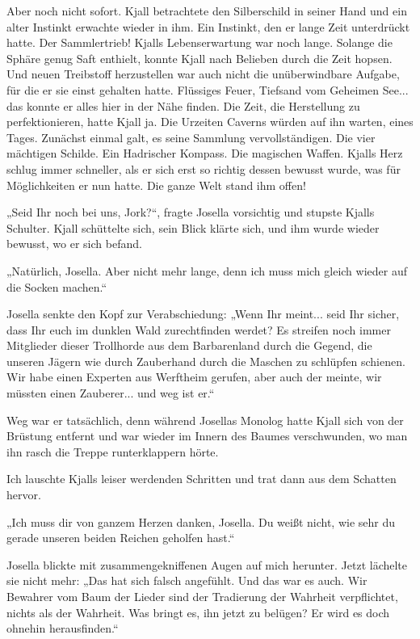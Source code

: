 \documentclass[10pt, a4paper, oneside]{book}
\begin{document}
Aber noch nicht sofort. Kjall betrachtete den Silberschild in seiner Hand und ein alter Instinkt erwachte wieder in ihm. Ein Instinkt, den er lange Zeit unterdrückt hatte. Der Sammlertrieb! Kjalls Lebenserwartung war noch lange. Solange die Sphäre genug Saft enthielt, konnte Kjall nach Belieben durch die Zeit hopsen. Und neuen Treibstoff herzustellen war auch nicht die unüberwindbare Aufgabe, für die er sie einst gehalten hatte. Flüssiges Feuer, Tiefsand vom Geheimen See... das konnte er alles hier in der Nähe finden. Die Zeit, die Herstellung zu perfektionieren, hatte Kjall ja. Die Urzeiten Caverns würden auf ihn warten, eines Tages. Zunächst einmal galt, es seine Sammlung vervollständigen. Die vier mächtigen Schilde. Ein Hadrischer Kompass. Die magischen Waffen. Kjalls Herz schlug immer schneller, als er sich erst so richtig dessen bewusst wurde, was für Möglichkeiten er nun hatte. Die ganze Welt stand ihm offen!\bigskip



„Seid Ihr noch bei uns, Jork?“, fragte Josella vorsichtig und stupste Kjalls Schulter. Kjall schüttelte sich, sein Blick klärte sich, und ihm wurde wieder bewusst, wo er sich befand.

„Natürlich, Josella. Aber nicht mehr lange, denn ich muss mich gleich wieder auf die Socken machen.“

Josella senkte den Kopf zur Verabschiedung: „Wenn Ihr meint... seid Ihr sicher, dass Ihr euch im dunklen Wald zurechtfinden werdet? Es streifen noch immer Mitglieder dieser Trollhorde aus dem Barbarenland durch die Gegend, die unseren Jägern wie durch Zauberhand durch die Maschen zu schlüpfen schienen. Wir habe einen Experten aus Werftheim gerufen, aber auch der meinte, wir müssten einen Zauberer... und weg ist er.“

Weg war er tatsächlich, denn während Josellas Monolog hatte Kjall sich von der Brüstung entfernt und war wieder im Innern des Baumes verschwunden, wo man ihn rasch die Treppe runterklappern hörte.

Ich lauschte Kjalls leiser werdenden Schritten und trat dann aus dem Schatten hervor.

„Ich muss dir von ganzem Herzen danken, Josella. Du weißt nicht, wie sehr du gerade unseren beiden Reichen geholfen hast.“

Josella blickte mit zusammengekniffenen Augen auf mich herunter. Jetzt lächelte sie nicht mehr: „Das hat sich falsch angefühlt. Und das war es auch. Wir Bewahrer vom Baum der Lieder sind der Tradierung der Wahrheit verpflichtet, nichts als der Wahrheit. Was bringt es, ihn jetzt zu belügen? Er wird es doch ohnehin herausfinden.“
\end{document}
